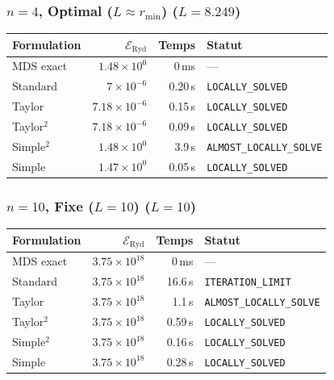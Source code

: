\subsubsection{$n=4$, Optimal ($L{\approx}r_{\min}$) ($L=8.249$)}
\begin{longtable}{@{}lrrl@{}}
  \toprule
  Formulation & $\mathcal{E}_{\mathrm{Ryd}}$ & Temps & Statut \\
  \midrule
  \endhead
  MDS exact & $1.48\times10^{0}$ & 0\,ms & --- \\
  Standard & $7\times10^{-6}$ & 0.20\,s & \texttt{LOCALLY\_SOLVED} \\
  Taylor & $7.18\times10^{-6}$ & 0.15\,s & \texttt{LOCALLY\_SOLVED} \\
  Taylor$^2$ & $7.18\times10^{-6}$ & 0.09\,s & \texttt{LOCALLY\_SOLVED} \\
  Simple$^2$ & $1.48\times10^{0}$ & 3.9\,s & \texttt{ALMOST\_LOCALLY\_SOLVE} \\
  Simple & $1.47\times10^{0}$ & 0.05\,s & \texttt{LOCALLY\_SOLVED} \\
  \bottomrule
\end{longtable}

\subsubsection{$n=10$, Fixe ($L{=}10$) ($L=10$)}
\begin{longtable}{@{}lrrl@{}}
  \toprule
  Formulation & $\mathcal{E}_{\mathrm{Ryd}}$ & Temps & Statut \\
  \midrule
  \endhead
  MDS exact & $3.75\times10^{18}$ & 0\,ms & --- \\
  Standard & $3.75\times10^{18}$ & 16.6\,s & \texttt{ITERATION\_LIMIT} \\
  Taylor & $3.75\times10^{18}$ & 1.1\,s & \texttt{ALMOST\_LOCALLY\_SOLVE} \\
  Taylor$^2$ & $3.75\times10^{18}$ & 0.59\,s & \texttt{LOCALLY\_SOLVED} \\
  Simple$^2$ & $3.75\times10^{18}$ & 0.16\,s & \texttt{LOCALLY\_SOLVED} \\
  Simple & $3.75\times10^{18}$ & 0.28\,s & \texttt{LOCALLY\_SOLVED} \\
  \bottomrule
\end{longtable}

